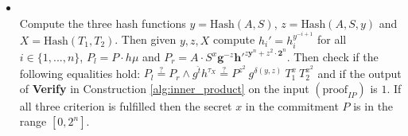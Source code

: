 \begin{algorithm}[]
\begin{itemize}
\item{}\\
Compute the three hash functions $y= \text{Hash}(A,S)$, $z= \text{Hash}(A,S,y)$ and $X= \text{Hash}(T_1,T_2)$. Then given  $y,z,X$ compute $h_i' = h_i ^{y^{-i+1}}$ for all $i\in\{1,...,n\}$, $P_l = P\cdot h\mu$ and $P_r = A\cdot S ^x \bm{g}^ {-z}\bm{h'}^{z\bm{y}^n+z^2\cdot \bm{2}^n}$. Then check if the following equalities hold: $P_l\overset{?}{=} P_r \wedge g^{\hat{t}}h^{\tau_X} \overset{?}{=}  P ^{z^2}\:g^{\delta(y,z)}\:T_1^x\:T_2^{x^2}$ and if the output of \textbf{Verify} in Construction \ref{alg:inner_product} on the input $(\text{proof}_{IP})$ is $1$. If all three criterion is fulfilled then the secret  $x$ in the commitment $P$ is in the range $[0,2^n]$.
\end{itemize}
\label{alg:bullet}
\end{algorithm}


